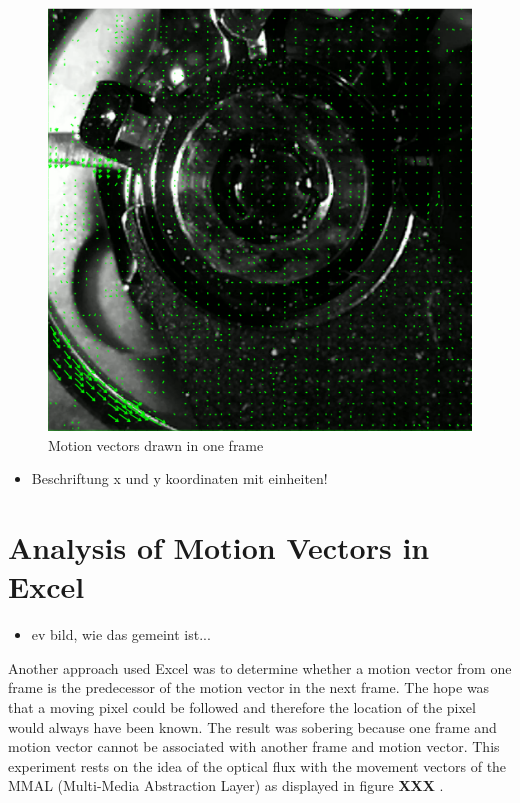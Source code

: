 \documentclass[12pt, a4paper]{report}
\begin{document}
    \noindent
    \begin{figure}[H]
    \centering
    \includegraphics[scale=0.5]{Images/motion_vectors.png}
    
    \caption{Motion vectors drawn in one frame}
    \end{figure}
    
        \begin{itemize}
    \item Beschriftung x und y koordinaten mit einheiten!
    \end{itemize}
    
    \section{Analysis of Motion Vectors in Excel}
    \begin{itemize}
        \item ev bild, wie das gemeint ist...
      \end{itemize}
    Another approach used Excel was to determine whether a motion vector from one frame is the predecessor of the motion vector in the next frame.
    The hope was that a moving pixel could be followed and therefore the location of the pixel would always have been known.
    The result was sobering because one frame and motion vector cannot be associated with another frame and motion vector.
    This experiment rests on the idea of the optical flux with the movement vectors of the MMAL (Multi-Media Abstraction Layer) as displayed in figure \textbf{XXX} .
    
\end{document}
